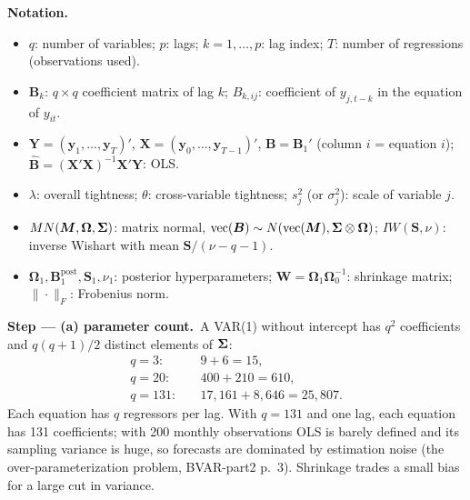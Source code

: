 \documentclass[11pt,a4paper]{article}
\newenvironment{notacao}{\par\smallskip\noindent\textbf{Notation.}\begin{itemize}[leftmargin=1.4em,topsep=1pt,itemsep=0pt]\small}{\end{itemize}}
\newcommand{\passo}[2]{\par\smallskip\noindent\textbf{Step --- #1.}~#2}
\begin{document}
\begin{sol}
\begin{notacao}
\item $q$: number of variables; $p$: lags; $k=1,\dots,p$: lag index; $T$: number of regressions (observations used).
\item $\bm B_k$: $q\times q$ coefficient matrix of lag $k$; $B_{k,ij}$: coefficient of $y_{j,t-k}$ in the equation of $y_{it}$.
\item $\bm Y=(\bm y_1,\dots,\bm y_T)'$, $\bm X=(\bm y_0,\dots,\bm y_{T-1})'$, $\bm B=\bm B_1'$ (column $i$ = equation $i$);
$\hat{\bm B}=(\bm X'\bm X)^{-1}\bm X'\bm Y$: OLS.
\item $\lambda$: overall tightness; $\theta$: cross-variable tightness; $s_j^2$ (or $\sigma_j^2$): scale of variable $j$.
\item $MN(\bm M,\bm\Omega,\bm{\Sigma})$: matrix normal, $\mathrm{vec}(\bm B)\sim N(\mathrm{vec}(\bm M),\bm{\Sigma}\otimes\bm\Omega)$;
$IW(\bm S,\nu)$: inverse Wishart with mean $\bm S/(\nu-q-1)$.
\item $\bm\Omega_1,\bm B_1^{\mathrm{post}},\bm S_1,\nu_1$: posterior hyperparameters; $\bm W=\bm\Omega_1\bm\Omega_0^{-1}$: shrinkage matrix;
$\|\cdot\|_F$: Frobenius norm.
\end{notacao}

\passo{(a) parameter count}{A VAR(1) without intercept has $q^2$ coefficients and $q(q+1)/2$ distinct elements of $\bm{\Sigma}$:
\begin{align}
q=3:&\quad 9+6=15,\nonumber\\
q=20:&\quad 400+210=610,\nonumber\\
q=131:&\quad 17{,}161+8{,}646=25{,}807.\nonumber
\end{align}
Each equation has $q$ regressors per lag. With $q=131$ and one lag, each equation has 131 coefficients; with 200 monthly
observations OLS is barely defined and its sampling variance is huge, so forecasts are dominated by estimation noise
(the over-parameterization problem, BVAR-part2 p.~3). Shrinkage trades a small bias for a large cut in variance.}


\end{sol}
\end{document}

